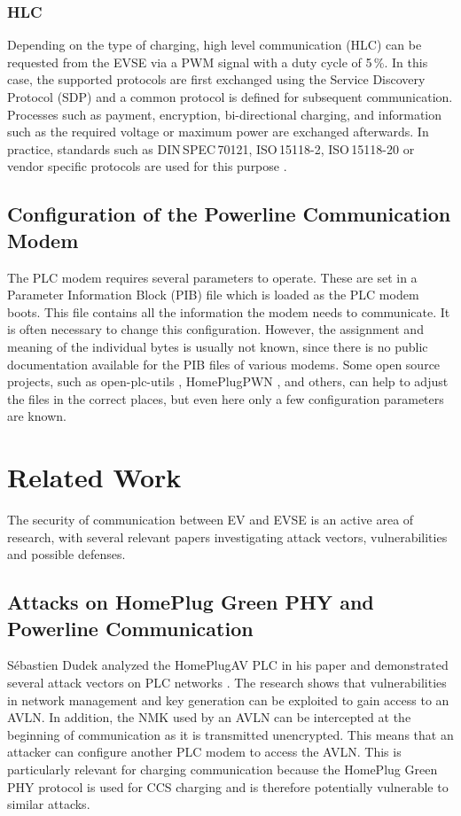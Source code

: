 \documentclass[sigconf]{acmart}
\begin{document}
\subsubsection{HLC}
Depending on the type of charging, high level communication (HLC) can be requested from the EVSE via a PWM signal with a duty cycle of 5\,\%. In this case, the supported protocols are first exchanged using the Service Discovery Protocol (SDP) and a common protocol is defined for subsequent communication. Processes such as payment, encryption, bi-directional charging, and information such as the required voltage or maximum power are exchanged afterwards. In practice, standards such as DIN\,SPEC\,70121, ISO\,15118-2, ISO\,15118-20 or vendor specific protocols are used for this purpose \citep{vector-charging-standards}.

\subsection{Configuration of the Powerline Communication Modem}
The PLC modem requires several parameters to operate. These are set in a Parameter Information Block (PIB) file which is loaded as the PLC modem boots. This file contains all the information the modem needs to communicate.
It is often necessary to change this configuration. However, the assignment and meaning of the individual bytes is usually not known, since there is no public documentation available for the PIB files of various modems. Some open source projects, such as open-plc-utils \citep{qcaopen-plc-utils}, HomePlugPWN \citep{fluxiushomeplugpwn}, and others, can help to adjust the files in the correct places, but even here only a few configuration parameters are known.

\section{Related Work}
The security of communication between EV and EVSE is an active area of research, with several relevant papers investigating attack vectors, vulnerabilities and possible defenses.

\subsection{Attacks on HomePlug Green PHY and Powerline Communication}
Sébastien Dudek analyzed the HomePlugAV PLC in his paper and demonstrated several attack vectors on PLC networks \citep[pp.\,15--22]{dudek-homeplugav-2015}. The research shows that vulnerabilities in network management and key generation can be exploited to gain access to an AVLN. In addition, the NMK used by an AVLN can be intercepted at the beginning of communication as it is transmitted unencrypted. This means that an attacker can configure another PLC modem to access the AVLN. This is particularly relevant for charging communication because the HomePlug Green PHY protocol is used for CCS charging and is therefore potentially vulnerable to similar attacks.
\end{document}
